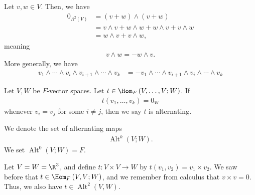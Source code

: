 \documentclass[10pt]{mypackage}
\DeclareMathOperator{\Alt}{Alt}
\begin{document}
\begin{definition}
    Let $v,w\in V$. Then, we have
    \begin{align*}
      0_{\Lambda^{2}\left(V\right)} &= \left(v+w\right)\wedge \left(v+w\right)\\
                                    &= v\wedge v + w\wedge w + w\wedge v + v\wedge w\\
                                    &= w\wedge v + v\wedge w,
    \end{align*}
    meaning
    \begin{align*}
      v\wedge w = -w\wedge v.
    \end{align*}
    More generally, we have
    \begin{align*}
      v_1\wedge \cdots \wedge v_i \wedge v_{i+1}\wedge \cdots \wedge v_k &= -v_1\wedge\cdots\wedge v_{i+1}\wedge v_i\wedge\cdots \wedge v_k
    \end{align*}
  \end{definition}
  \begin{definition}
    Let $V,W$ be $F$-vector spaces. Let $t\in \Hom_{F}\left(V,\dots,V;W\right)$. If
    \begin{align*}
      t\left(v_1,\dots,v_k\right) = 0_{W}
    \end{align*}
    whenever $v_i = v_j$ for some $i\neq j$, then we say $t$ is alternating.\newline

    We denote the set of alternating maps
    \begin{align*}
      \Alt^{k}\left(V;W\right).
    \end{align*}
    We set $\Alt^{0}\left(V;W\right) = F$.
  \end{definition}
  \begin{example}
    Let $V = W = \R^3$, and define $t: V\times V \rightarrow W$ by $t\left(v_1,v_2\right) = v_1\times v_2$. We saw before that $t\in \Hom_{F}\left(V,V;W\right)$, and we remember from calculus that $v\times v = 0$. Thus, we also have $t\in \Alt^{2}\left(V,W\right)$.
  \end{example}
\end{document}
